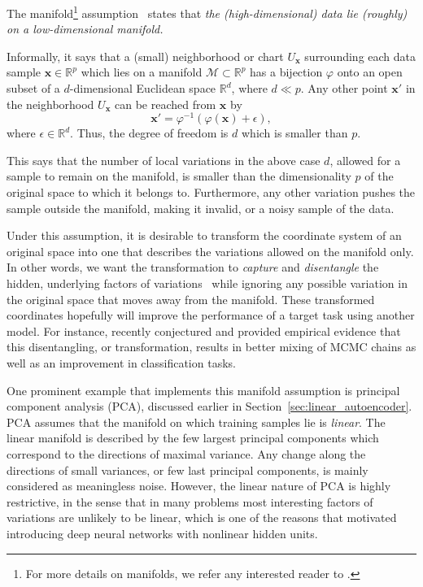 \documentclass{now}
\newcommand{\vect}[1]{\mathbf{#1}}
\newcommand{\vx}[0]{\vect{x}}
\newcommand{\RR}[0]{\mathbb{R}}
\newcommand{\MM}[0]{\mathcal{M}}
\begin{document}
The manifold\footnote{ 
    For more details on manifolds, we refer any interested reader to
    \citep{Absil2008}.
} assumption~\citep{Chapelle2006} states that \textit{the (high-dimensional)
data lie (roughly) on a low-dimensional manifold.}

Informally, it says that a (small) neighborhood or chart $U_\vx$ surrounding
each data sample $\vx \in \RR^p$ which lies on a manifold $\MM \subset \RR^p$
has a bijection $\varphi$ onto an open subset of a $d$-dimensional Euclidean
space $\RR^d$, where $d \ll p$.  Any other point $\vx'$ in the neighborhood
$U_\vx$ can be reached from $\vx$ by 
\[
\vx' = \varphi^{-1} \left( \varphi(\vx) + \epsilon \right),
\]
where $\epsilon \in \RR^d$. Thus, the degree of freedom is $d$ which is smaller
than $p$.

This says that the number of local variations in the above case $d$, allowed for
a sample to remain on the manifold, is smaller than the dimensionality $p$ of
the original space to which it belongs to. Furthermore, any other variation
pushes the sample outside the manifold, making it invalid, or a noisy sample of
the data.

Under this assumption, it is desirable to transform the coordinate system of an
original space into one that describes the variations allowed on the manifold
only. In other words, we want the transformation to \textit{capture} and
\textit{disentangle} the hidden, underlying factors of
variations~\citep{Bengio2009a} while ignoring any possible variation in the
original space that moves away from the manifold. These transformed coordinates
hopefully will improve the performance of a target task using another model. For
instance, \citet{Bengio2013} recently conjectured and provided empirical
evidence that this disentangling, or transformation, results in better mixing of
MCMC chains as well as an improvement in classification tasks.

One prominent example that implements this manifold assumption is principal
component analysis (PCA), discussed earlier in
Section~\ref{sec:linear_autoencoder}. PCA assumes that the manifold on which
training samples lie is \textit{linear}. The linear manifold is described by the
few largest principal components which correspond to the directions of maximal
variance. Any change along the directions of
small variances, or few last principal components, is mainly considered as
meaningless noise. However, the linear nature of PCA is highly restrictive, in
the sense that in many problems most interesting factors of variations are
unlikely to be linear, which is one of the reasons that motivated introducing
deep neural networks with nonlinear hidden units.
\end{document}
